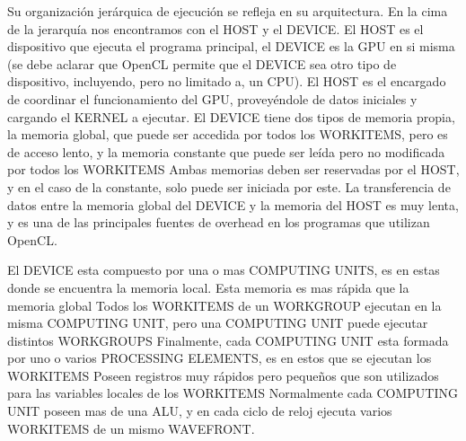 Su organización jerárquica de ejecución se refleja en su arquitectura. En la cima
de la jerarquía nos encontramos con el HOST y el DEVICE. El HOST es el
dispositivo que ejecuta el programa principal, el DEVICE es la GPU en si misma
(se debe aclarar que OpenCL permite que el DEVICE sea otro tipo de dispositivo,
incluyendo, pero no limitado a, un CPU). El HOST es el encargado de coordinar el
funcionamiento del GPU, proveyéndole de datos iniciales y cargando el KERNEL a
ejecutar. El DEVICE tiene dos tipos de memoria propia, la memoria global, que
puede ser accedida por todos los WORKITEMS, pero es de acceso lento, y la
memoria constante que puede ser leída pero no modificada por todos los WORKITEMS
Ambas memorias deben ser reservadas por el HOST, y en el caso de la constante,
solo puede ser iniciada por este. La transferencia de datos entre la memoria
global del DEVICE y la memoria del HOST es muy lenta, y es una de las
principales fuentes de overhead en los programas que utilizan OpenCL.

El DEVICE esta compuesto por una o mas COMPUTING UNITS, es en estas donde se
encuentra la memoria local. Esta memoria es mas rápida que la memoria global
Todos los WORKITEMS de un WORKGROUP ejecutan en la misma COMPUTING UNIT, pero
una COMPUTING UNIT puede ejecutar distintos WORKGROUPS Finalmente, cada
COMPUTING UNIT esta formada por uno o varios PROCESSING ELEMENTS, es en estos
que se ejecutan los WORKITEMS Poseen registros muy rápidos pero pequeños que son
utilizados para las variables locales de los WORKITEMS Normalmente cada
COMPUTING UNIT poseen mas de una ALU, y en cada ciclo de reloj ejecuta varios
WORKITEMS de un mismo WAVEFRONT.
